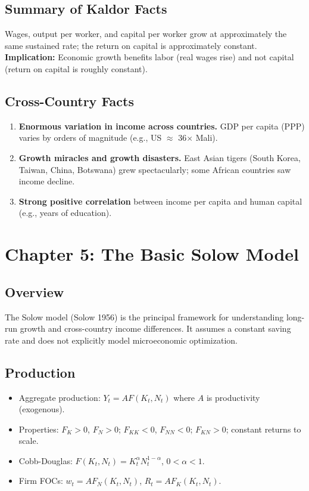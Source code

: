 \documentclass[12pt]{article}
\begin{document}
\subsection{Summary of Kaldor Facts}
Wages, output per worker, and capital per worker grow at approximately the same sustained rate; the return on capital is approximately constant. \textbf{Implication:} Economic growth benefits labor (real wages rise) and not capital (return on capital is roughly constant).

\subsection{Cross-Country Facts}
\begin{enumerate}
    \item \textbf{Enormous variation in income across countries.} GDP per capita (PPP) varies by orders of magnitude (e.g., US $\approx$ 36$\times$ Mali).
    \item \textbf{Growth miracles and growth disasters.} East Asian tigers (South Korea, Taiwan, China, Botswana) grew spectacularly; some African countries saw income decline.
    \item \textbf{Strong positive correlation} between income per capita and human capital (e.g., years of education).
\end{enumerate}

\section{Chapter 5: The Basic Solow Model}

\subsection{Overview}
The Solow model (Solow 1956) is the principal framework for understanding long-run growth and cross-country income differences. It assumes a constant saving rate and does not explicitly model microeconomic optimization.

\subsection{Production}
\begin{itemize}
    \item Aggregate production: $Y_t = A F(K_t, N_t)$ where $A$ is productivity (exogenous).
    \item Properties: $F_K > 0$, $F_N > 0$; $F_{KK} < 0$, $F_{NN} < 0$; $F_{KN} > 0$; constant returns to scale.
    \item Cobb-Douglas: $F(K_t, N_t) = K_t^{\alpha} N_t^{1-\alpha}$, $0 < \alpha < 1$.
    \item Firm FOCs: $w_t = A F_N(K_t, N_t)$, $R_t = A F_K(K_t, N_t)$.
\end{itemize}
\end{document}
